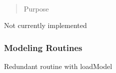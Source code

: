 \documentclass[letterpaper,10pt,english]{sphinxmanual}
\begin{document}

\begin{fulllineitems}
\label{api:splat_plot.plotIndices}~\begin{quote}\begin{description}
\item[{Purpose}] \leavevmode
{}

\end{description}\end{quote}

Not currently implemented

\end{fulllineitems}



\subsubsection{Modeling Routines}
\label{api:modeling-routines}

\begin{fulllineitems}
\label{api:splat_model.getModel}
Redundant routine with loadModel

\end{fulllineitems}

\end{document}
